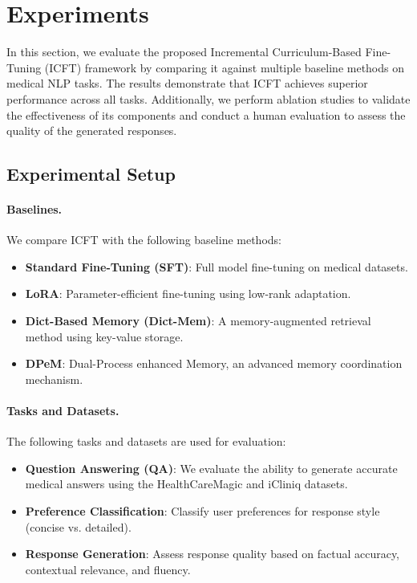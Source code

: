 \section{Experiments}

In this section, we evaluate the proposed Incremental Curriculum-Based Fine-Tuning (ICFT) framework by comparing it against multiple baseline methods on medical NLP tasks. The results demonstrate that ICFT achieves superior performance across all tasks. Additionally, we perform ablation studies to validate the effectiveness of its components and conduct a human evaluation to assess the quality of the generated responses.

\subsection{Experimental Setup}

\paragraph{Baselines.}
We compare ICFT with the following baseline methods:
\begin{itemize}
    \item \textbf{Standard Fine-Tuning (SFT)}: Full model fine-tuning on medical datasets.
    \item \textbf{LoRA}: Parameter-efficient fine-tuning using low-rank adaptation.
    \item \textbf{Dict-Based Memory (Dict-Mem)}: A memory-augmented retrieval method using key-value storage.
    \item \textbf{DPeM}: Dual-Process enhanced Memory, an advanced memory coordination mechanism.
\end{itemize}

\paragraph{Tasks and Datasets.}
The following tasks and datasets are used for evaluation:
\begin{itemize}
    \item \textbf{Question Answering (QA)}: We evaluate the ability to generate accurate medical answers using the HealthCareMagic and iCliniq datasets.
    \item \textbf{Preference Classification}: Classify user preferences for response style (concise vs. detailed).
    \item \textbf{Response Generation}: Assess response quality based on factual accuracy, contextual relevance, and fluency.
\end{itemize}

